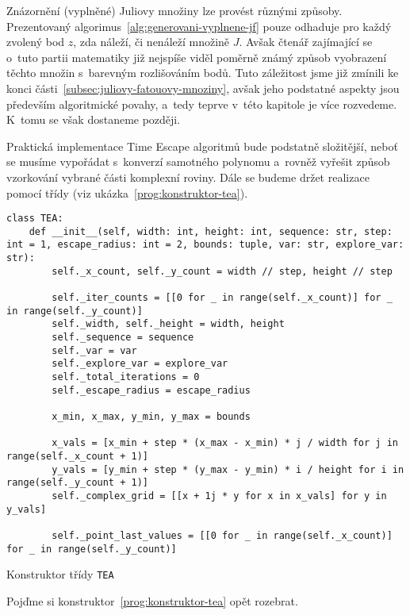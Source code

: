 Znázornění (vyplněné) Juliovy množiny lze provést různými způsoby. Prezentovaný algorimus~\ref{alg:generovani-vyplnene-jf} pouze odhaduje pro každý zvolený bod $z$, zda náleží, či nenáleží množině $J$. Avšak čtenář zajímající se o~tuto partii matematiky již nejspíše viděl poměrně známý způsob vyobrazení těchto množin s~barevným rozlišováním bodů. Tuto záležitost jsme již zmínili ke konci části~\ref{subsec:juliovy-fatouovy-mnoziny}, avšak jeho podstatné aspekty jsou především algoritmické povahy, a~tedy teprve v~této kapitole je více rozvedeme. K~tomu se však dostaneme později.

Praktická implementace Time Escape algoritmů bude podstatně složitější, neboť se musíme vypořádat s~konverzí samotného polynomu a~rovněž vyřešit způsob vzorkování vybrané části komplexní roviny. Dále se budeme držet realizace pomocí třídy (viz ukázka~\ref{prog:konstruktor-tea}).
\begin{program}[h]
\begin{lstlisting}[style=python]
class TEA:
    def __init__(self, width: int, height: int, sequence: str, step: int = 1, escape_radius: int = 2, bounds: tuple, var: str, explore_var: str):
        self._x_count, self._y_count = width // step, height // step
        
        self._iter_counts = [[0 for _ in range(self._x_count)] for _ in range(self._y_count)]
        self._width, self._height = width, height
        self._sequence = sequence
        self._var = var
        self._explore_var = explore_var
        self._total_iterations = 0
        self._escape_radius = escape_radius

        x_min, x_max, y_min, y_max = bounds

        x_vals = [x_min + step * (x_max - x_min) * j / width for j in range(self._x_count + 1)]
        y_vals = [y_min + step * (y_max - y_min) * i / height for i in range(self._y_count + 1)]
        self._complex_grid = [[x + 1j * y for x in x_vals] for y in y_vals]

        self._point_last_values = [[0 for _ in range(self._x_count)] for _ in range(self._y_count)]
\end{lstlisting}
    \caption{Konstruktor třídy \texttt{TEA}}
    \label{prog:konstruktor-tea}
\end{program}
Pojďme si konstruktor~\ref{prog:konstruktor-tea} opět rozebrat.
